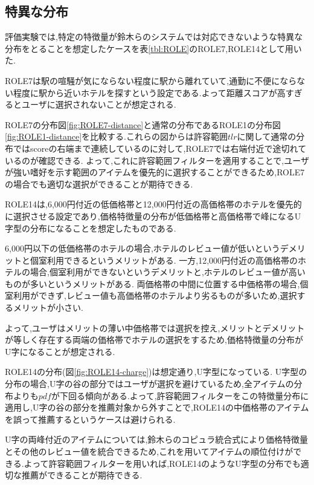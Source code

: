 \subsection{特異な分布}
評価実験では,特定の特徴量が鈴木らのシステムでは対応できないような特異な分布をとることを想定したケースを表\ref{tbl:ROLE}のROLE7,ROLE14として用いた.\par
\label{sbsc:ROLE7}
ROLE7は駅の喧騒が気にならない程度に駅から離れていて,通勤に不便にならない程度に駅から近いホテルを探すという設定である.よって距離スコアが高すぎるとユーザに選択されないことが想定される.\par
ROLE7の分布図\ref{fig:ROLE7-distance}と通常の分布であるROLE1の分布図\ref{fig:ROLE1-distance}を比較する.これらの図からは許容範囲$tlr$に関して通常の分布ではscoreの右端まで連続しているのに対して,ROLE7では右端付近で途切れているのが確認できる.
よって,これに許容範囲フィルターを適用することで,ユーザが強い嗜好を示す範囲のアイテムを優先的に選択することができるため,ROLE7の場合でも適切な選択ができることが期待できる.\par
\label{sbsc:ROLE14}
ROLE14は,6,000円付近の低価格帯と12,000円付近の高価格帯のホテルを優先的に選択させる設定であり,価格特徴量の分布が低価格帯と高価格帯で峰になるU字型の分布になることを想定したものである.\par
6,000円以下の低価格帯のホテルの場合,ホテルのレビュー値が低いというデメリットと個室利用できるというメリットがある.
一方,12,000円付近の高価格帯のホテルの場合,個室利用ができないというデメリットと,ホテルのレビュー値が高いものが多いというメリットがある.
両価格帯の中間に位置する中価格帯の場合,個室利用ができず,レビュー値も高価格帯のホテルより劣るものが多いため,選択するメリットが小さい.\par
よって,ユーザはメリットの薄い中価格帯では選択を控え,メリットとデメリットが等しく存在する両端の価格帯でホテルの選択をするため,価格特徴量の分布がU字になることが想定される.\par
ROLE14の分布(図\ref{fig:ROLE14-charge})は想定通り,U字型になっている.
U字型の分布の場合,U字の谷の部分ではユーザが選択を避けているため,全アイテムの分布よりも$pdf$が下回る傾向がある.よって,許容範囲フィルターをこの特徴量分布に適用し,U字の谷の部分を推薦対象から外すことで,ROLE14の中価格帯のアイテムを誤って推薦するというケースは避けられる.\par
U字の両峰付近のアイテムについては,鈴木らのコピュラ統合式により価格特徴量とその他のレビュー値を統合できるため,これを用いてアイテムの順位付けができる.よって許容範囲フィルターを用いれば,ROLE14のようなU字型の分布でも適切な推薦ができることが期待できる.

